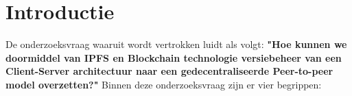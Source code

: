 
\section{Introductie} %
\label{sec:introductie}

De onderzoeksvraag waaruit wordt vertrokken luidt als volgt: \textbf{"Hoe kunnen we doormiddel van IPFS en Blockchain technologie versiebeheer van een Client-Server architectuur naar een gedecentraliseerde Peer-to-peer model overzetten?"} Binnen deze onderzoeksvraag zijn er vier begrippen:\\\\
